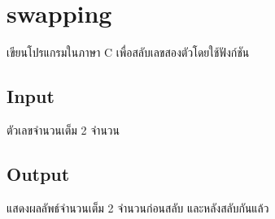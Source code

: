 \documentclass{article}
\begin{document}
\section*{swapping}

เขียนโปรแกรมในภาษา C เพื่อสลับเลขสองตัวโดยใช้ฟังก์ชัน\\



\subsection*{Input}
ตัวเลขจำนวนเต็ม 2 จำนวน



\subsection*{Output}
แสดงผลลัพธ์จำนวนเต็ม 2 จำนวนก่อนสลับ และหลังสลับกันแล้ว
\end{document}
